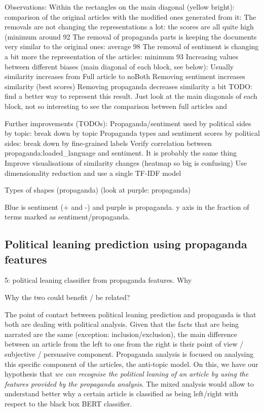 Observations:
Within the rectangles on the main diagonal (yellow bright): comparison of the original articles with the modified ones generated from it:
The removals are not changing the representations a lot: the scores are all quite high (minimum around 92%
The removal of propaganda parts is keeping the documents very similar to the original ones: average 98%
The removal of sentiment is changing a bit more the representation of the articles: minimum 93%
Increasing values between different biases (main diagonal of each block, see below):
Usually similarity increases from Full article to noBoth
Removing sentiment increases similarity (best scores)
Removing propaganda decreases similarity a bit
TODO: find a better way to represent this result. Just look at the main diagonals of each block, not so interesting to see the comparison between full articles and 

Further improvements (TODOs):
Propaganda/sentiment used by political sides by topic: break down by topic
Propaganda types and sentiment scores by political sides: break down by fine-grained labels
Verify correlation between propaganda:loaded\_language and sentiment. It is probably the same thing
Improve visualisations of similarity changes (heatmap so big is confusing)
Use dimensionality reduction and use a single TF-IDF model



Types of shapes (propaganda)
(look at purple: propaganda)

Blue is sentiment (+ and -) and purple is propaganda. 
y axis in the fraction of terms marked as sentiment/propaganda.




\subsection{Political leaning prediction using propaganda features}
5: political leaning classifier from propaganda features. Why


Why the two could benefit / be related?

The point of contact between political leaning prediction and propaganda is that both are dealing with political analysis.
Given that the facts that are being narrated are the same (exception: inclusion/exclusion), the main difference between an article from the left to one from the right is their point of view / subjective / persuasive component. Propaganda analysis is focused on analysing this specific component of the articles, the anti-topic model.
On this, we have our hypothesis that \emph{we can recognise the political leaning of an article by using the features provided by the propaganda analysis}.
The mixed analysis would allow to understand better why a certain article is classified as being left/right with respect to the black box BERT classifier.

